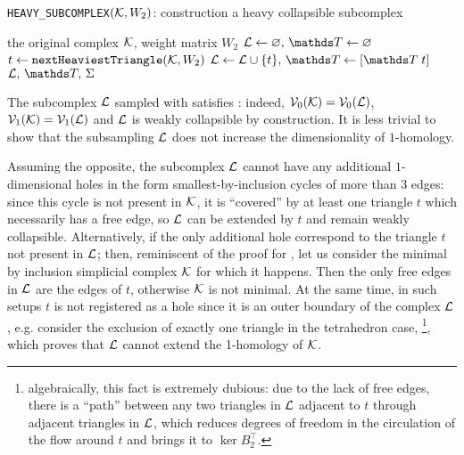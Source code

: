 \begin{algorithm}[h]
      \caption{ \texttt{HEAVY\_SUBCOMPLEX}\( (\mathcal{K}, W_2) \): construction a heavy collapsible subcomplex
      \label{algo:heavy_subsampling}}
      \begin{algorithmic}[1]
            \Require the original complex \( \mathcal{K} \), weight matrix \( W_2 \)
            \State \( \mc L  \gets \vn, \, \ds T \gets \vn  \) 
                  \State \( t \gets \texttt{nextHeaviestTriangle}(\mathcal{K}, W_2) \) 
                   
                        \State \( \mc L \gets \mc L \cup \{ t \},\, \ds T \gets [ \ds T \; t ]  \) 
                  \EndIf
            \EndWhile
             \State \Return \( \mc L, \, \ds T, \, \Sigma \) 
      \end{algorithmic}
\end{algorithm}

\begin{remark}
      The subcomplex \( \mathcal{L} \) sampled with  satisfies : indeed, \( \mathcal{V}_{0}(\mathcal{K}) = \mathcal{V}_0(\mathcal{L})\), \( \mathcal{V}_{1}(\mathcal{K}) = \mathcal{V}_1(\mathcal{L}) \) and \( \mathcal{L} \) is weakly collapsible by construction. It is less trivial to show that the subsampling \( \mathcal{L} \) does not increase the dimensionality of \(1\)-homology.

      Assuming the opposite, the subcomplex \( \mathcal{L} \) cannot have any additional \(1\)-dimensional holes in the form smallest-by-inclusion cycles of more than \( 3 \) edges: since this cycle is not present in \( \mathcal{K} \), it is ``covered'' by at least one triangle \( t \) which necessarily has a free edge, so \( \mathcal{L} \) can be extended by \(t\) and remain weakly collapsible. Alternatively, if the only additional hole correspond to the triangle \( t \) not present in \( \mathcal{L} \); then, reminiscent of the proof for , let us consider the minimal by inclusion simplicial complex \( \mathcal{K} \) for which it happens. Then the only free edges in \( \mathcal{L} \)  are the edges of \( t \), otherwise \( \mathcal{K} \) is not minimal. At the same time, in such setups \( t\) is not registered as a hole since it is an outer  boundary of the complex \( \mathcal{L} \), e.g. consider the exclusion of exactly one triangle in the tetrahedron case,  \footnote{algebraically, this fact is extremely dubious: due to the lack of free edges, there is a ``path'' between any two triangles in \( \mathcal{L} \) adjacent to \( t \) through adjacent triangles in \( \mathcal{L} \), which reduces degrees of freedom in the circulation of the flow around \( t \) and brings it to \( \ker B_2^\top \).}, which proves that \( \mathcal{L} \) cannot extend the 1-homology of \( \mathcal{K} \). 
\end{remark}


